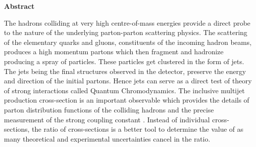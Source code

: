 \begin{center}
{\bf \huge Abstract}
\end{center}

The hadrons colliding at very high centre-of-mass energies provide a direct probe to the nature of the underlying parton-parton scattering physics. The scattering of the elementary quarks and gluons, constituents of the incoming hadron beams, produces a high momentum partons which then fragment and hadronize producing a spray of particles. These particles get clustered in the form of jets. The jets being the final structures observed in the detector, preserve the energy and direction of the initial partons. Hence jets can serve as a direct test of theory of strong interactions called Quantum Chromodynamics. The inclusive multijet production cross-section is an important observable which provides the details of parton distribution functions of the colliding hadrons and the precise measurement of the strong coupling constant \alps. Instead of individual cross-sections, the ratio of cross-sections is a better tool to determine the value of \alps as many theoretical and experimental uncertainties cancel in the ratio.

